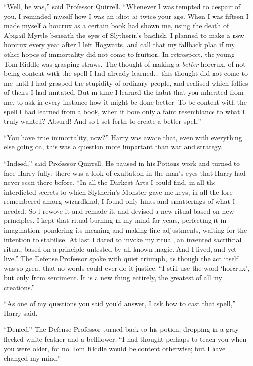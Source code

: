 ``Well, he was,'' said Professor Quirrell. ``Whenever I was tempted to despair of you, I reminded myself how I was an idiot at twice your age. When I was fifteen I made myself a horcrux as a certain book had shown me, using the death of Abigail Myrtle beneath the eyes of Slytherin's basilisk. I planned to make a new horcrux every year after I left Hogwarts, and call that my fallback plan if my other hopes of immortality did not come to fruition. In retrospect, the young Tom Riddle was grasping straws. The thought of making a \emph{better} horcrux, of not being content with the spell I had already learned... this thought did not come to me until I had grasped the stupidity of ordinary people, and realised which follies of theirs I had imitated. But in time I learned the habit that you inherited from me, to ask in every instance how it might be done better. To be content with the spell I had learned from a book, when it bore only a faint resemblance to what I truly wanted? Absurd! And so I set forth to create a better spell.''

``You have true immortality, now?'' Harry was aware that, even with everything else going on, this was a question more important than war and strategy.

``Indeed,'' said Professor Quirrell. He paused in his Potions work and turned to face Harry fully; there was a look of exultation in the man's eyes that Harry had never seen there before. ``In all the Darkest Arts I could find, in all the interdicted secrets to which Slytherin's Monster gave me keys, in all the lore remembered among wizardkind, I found only hints and smatterings of what I needed. So I rewove it and remade it, and devised a new ritual based on new principles. I kept that ritual burning in my mind for years, perfecting it in imagination, pondering its meaning and making fine adjustments, waiting for the intention to stabilise. At last I dared to invoke my ritual, an invented sacrificial ritual, based on a principle untested by all known magic. And I lived, and yet live.'' The Defense Professor spoke with quiet triumph, as though the act itself was so great that no words could ever do it justice. ``I still use the word `horcrux', but only from sentiment. It is a new thing entirely, the greatest of all my creations.''

``As one of my questions you said you'd answer, I ask how to cast that spell,'' Harry said.

``Denied.'' The Defense Professor turned back to his potion, dropping in a gray-flecked white feather and a bellflower. ``I had thought perhaps to teach you when you were older, for no Tom Riddle would be content otherwise; but I have changed my mind.''

